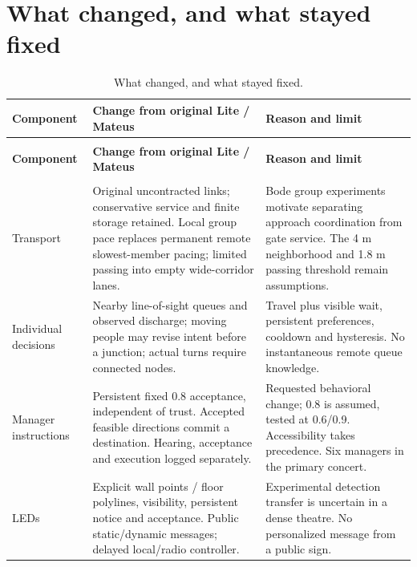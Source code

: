 \documentclass[11pt,a4paper]{article}
\begin{document}
\section{What changed, and what stayed fixed}

\begingroup\small
\begin{longtable}{@{}>{\raggedright\arraybackslash}p{}>{\raggedright\arraybackslash}p{}>{\raggedright\arraybackslash}p{}@{}}
\caption{What changed, and what stayed fixed.}\label{tab:1}\\
\toprule
\textbf{Component} & \textbf{Change from original Lite / Mateus} & \textbf{Reason and limit} \\
\midrule\endfirsthead
\multicolumn{3}{l}{\small\itshape Table \thetable{} continued}\\\toprule
\textbf{Component} & \textbf{Change from original Lite / Mateus} & \textbf{Reason and limit} \\
\midrule\endhead
\midrule\multicolumn{3}{r}{\small Continued on next page}\\\endfoot
\bottomrule\endlastfoot
Transport & Original uncontracted links; conservative service and finite storage retained. Local group pace replaces permanent remote slowest-member pacing; limited passing into empty wide-corridor lanes. & Bode group experiments \cite{R23} motivate separating approach coordination from gate service. The 4 m neighborhood and 1.8 m passing threshold remain assumptions. \\
Individual decisions & Nearby line-of-sight queues and observed discharge; moving people may revise intent before a junction; actual turns require connected nodes. & Travel plus visible wait, persistent preferences, cooldown and hysteresis. No instantaneous remote queue knowledge. \\
Manager instructions & Persistent fixed 0.8 acceptance, independent of trust. Accepted feasible directions commit a destination. Hearing, acceptance and execution logged separately. & Requested behavioral change; 0.8 is assumed, tested at 0.6/0.9. Accessibility takes precedence. Six managers in the primary concert. \\
LEDs & Explicit wall points / floor polylines, visibility, persistent notice and acceptance. Public static/dynamic messages; delayed local/radio controller. & Experimental detection \cite{R24} transfer is uncertain in a dense theatre. No personalized message from a public sign. \\

\end{longtable}
\end{document}

